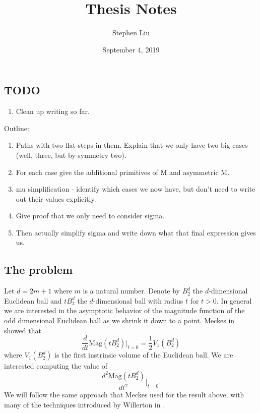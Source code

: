 \documentclass[11pt]{article}
\theoremstyle{definition}
\theoremstyle{definition}
\theoremstyle{plain}
\theoremstyle{plain}
\theoremstyle{plain}
\theoremstyle{definition}
\begin{document}
\author{Stephen Liu}
\title{Thesis Notes}
\date{September 4, 2019}

\maketitle

\subsection*{TODO}
\begin{enumerate}
\item Clean up writing so far.
\end{enumerate}

Outline:
\begin{enumerate}[label=(\alph*)]
\item Paths with two flat steps in them. Explain that we only have two big cases (well, three, but by symmetry two).
\item For each case give the additional primitives of M and asymmetric M.
\item mu simplification - identify which cases we now have, but don't need to write out their values explicitly.
\item Give proof that we only need to consider sigma.
\item Then actually simplify sigma and write down what that final expression gives us.
\end{enumerate}

\subsection*{The problem}

Let $d = 2m+1$ where $m$ is a natural number. Denote by $B_2^d$ the $d$-dimensional Euclidean ball and $tB_2^d$ the $d$-dimensional ball with radius $t$ for $t > 0$. In general we are interested in the asymptotic behavior of the magnitude function of the odd dimensional Euclidean ball as we shrink it down to a point. Meckes in \cite{meckes_magnitude_2019} showed that
\begin{equation*}
\frac{d}{dt}\text{Mag}(tB_2^d)\big\vert_{t=0} = \frac{1}{2}V_1(B_2^d)
\end{equation*}
where $V_1(B_2^d)$ is the first instrinsic volume of the Euclidean ball.
We are interested computing the value of
\begin{equation*}
\frac{d^2\text{Mag}(tB_2^d)}{dt^2}\big\vert_{t=0}.
\end{equation*}
We will follow the same approach that Meckes used for the result above, with many of the techniques introduced by Willerton in \cite{willerton_magnitude_2017}.
\end{document}

